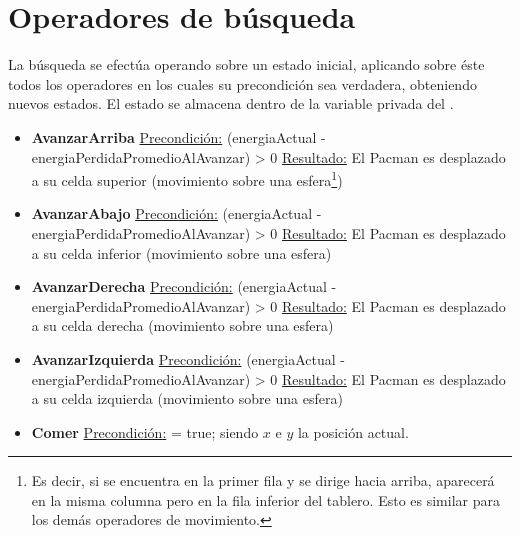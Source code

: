 \section{Operadores de búsqueda}

La búsqueda se efectúa operando sobre un estado inicial, aplicando sobre éste
todos los operadores en los cuales su precondición sea verdadera, obteniendo
nuevos estados. El estado se almacena dentro de la variable privada
 del .

\begin{itemize}

\item \textbf{AvanzarArriba}\newline
\underline{Precondición:} (energiaActual - energiaPerdidaPromedioAlAvanzar) > 0
\newline
\underline{Resultado:} El Pacman es desplazado a su celda superior (movimiento
sobre una esfera\footnote{Es decir, si se encuentra en la primer fila y se
dirige hacia arriba, aparecerá en la misma columna pero en la fila inferior del
tablero.  Esto es similar para los demás operadores de movimiento.})

\item \textbf{AvanzarAbajo}\newline
\underline{Precondición:} (energiaActual - energiaPerdidaPromedioAlAvanzar) > 0
\newline
\underline{Resultado:} El Pacman es desplazado a su celda inferior (movimiento
sobre una esfera)\newline

\item \textbf{AvanzarDerecha}\newline
\underline{Precondición:} (energiaActual - energiaPerdidaPromedioAlAvanzar) > 0
\newline
\underline{Resultado:} El Pacman es desplazado a su celda derecha (movimiento
sobre una esfera)\newline

\item \textbf{AvanzarIzquierda}\newline
\underline{Precondición:} (energiaActual - energiaPerdidaPromedioAlAvanzar) > 0
\newline
\underline{Resultado:} El Pacman es desplazado a su celda izquierda (movimiento
sobre una esfera)\newline

\item \textbf{Comer}\newline
\underline{Precondición:}  = true;
siendo $x$ e $y$ la posición actual.


\end{itemize}
